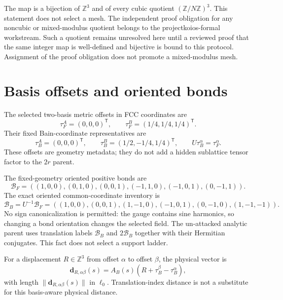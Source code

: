 \documentclass[11pt]{article}
\newcommand{\ZZ}{\mathbb Z}
\newcommand{\BB}{\mathcal B_B}
\newcommand{\BF}{\mathcal B_F}
\begin{document}
The map is a bijection of $\ZZ^3$ and of every cubic quotient
$(\ZZ/N\ZZ)^3$.  This statement does not select a mesh.  The independent proof
obligation for any noncubic or mixed-modulus quotient belongs to the
projectkoios-formal workstream.  Such a quotient remains unresolved here until a
reviewed proof that the same integer map is well-defined and bijective is bound to this
protocol.  Assignment of the proof obligation does not promote a mixed-modulus mesh.

\section{Basis offsets and oriented bonds}

The selected two-basis metric offsets in FCC coordinates are
\begin{equation}
 \tau_F^A=(0,0,0)^{\mathsf T},
 \qquad
 \tau_F^B=(1/4,1/4,1/4)^{\mathsf T}.
\end{equation}
Their fixed Bain-coordinate representatives are
\begin{equation}
 \tau_B^A=(0,0,0)^{\mathsf T},
 \qquad
 \tau_B^B=(1/2,-1/4,1/4)^{\mathsf T},
 \qquad
 U\tau_B^\alpha=\tau_F^\alpha.
\end{equation}
These offsets are geometry metadata; they do not add a hidden sublattice tensor factor
to the $2r$ parent.

The fixed-geometry oriented positive bonds are
\begin{equation}
 \BF=((1,0,0),(0,1,0),(0,0,1),(-1,1,0),(-1,0,1),(0,-1,1)).
\end{equation}
The exact oriented common-coordinate inventory is
\begin{equation}
 \BB=U^{-1}\BF
 =((1,0,0),(0,0,1),(1,-1,0),(-1,0,1),(0,-1,0),(1,-1,-1)).
\end{equation}
No sign canonicalization is permitted: the gauge contains sine harmonics, so changing a
bond orientation changes the selected field.  The un-attacked analytic parent uses
translation labels $\BB$ and $2\BB$ together with their Hermitian conjugates.  This fact
does not select a support ladder.

For a displacement $R\in\ZZ^3$ from offset $\alpha$ to offset $\beta$, the physical
vector is
\begin{equation}
 \mathbf d_{R,\alpha\beta}(s)
 =A_B(s)(R+\tau_B^\beta-\tau_B^\alpha),
\end{equation}
with length $\lVert\mathbf d_{R,\alpha\beta}(s)\rVert$ in $\ell_0$.  Translation-index
distance is not a substitute for this basis-aware physical distance.
\end{document}
